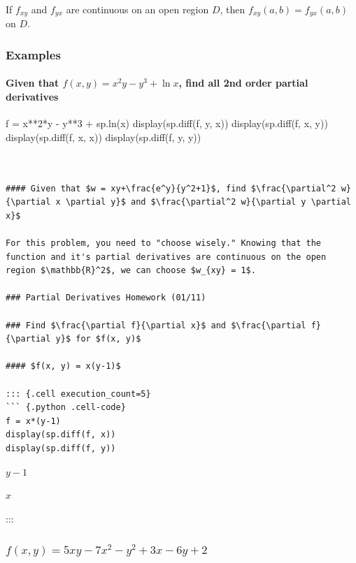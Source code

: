 \documentclass[
  letterpaper,
  DIV=11,
  numbers=noendperiod]{scrartcl}
\let\oldparagraph\paragraph
\renewcommand{\paragraph}[1]{\oldparagraph{#1}\mbox{}}
\begin{document}
If \(f_{xy}\) and \(f_{yx}\) are continuous on an open region \(D\),
then \(f_{xy}(a, b) = f_{yx}(a, b)\) on \(D\).

\hypertarget{examples-6}{%
\subsubsection{Examples}\label{examples-6}}

\hypertarget{given-that-fx-y-x2y-y3ln-x-find-all-2nd-order-partial-derivatives}{%
\paragraph{\texorpdfstring{Given that \(f(x, y) = x^2y-y^3+\ln x\), find
\textbf{all} 2nd order partial
derivatives}{Given that f(x, y) = x\^{}2y-y\^{}3+\textbackslash ln x, find all 2nd order partial derivatives}}\label{given-that-fx-y-x2y-y3ln-x-find-all-2nd-order-partial-derivatives}}

f = x**2*y - y**3 + sp.ln(x) display(sp.diff(f, y, x))
display(sp.diff(f, x, y)) display(sp.diff(f, x, x)) display(sp.diff(f,
y, y))

\begin{verbatim}


#### Given that $w = xy+\frac{e^y}{y^2+1}$, find $\frac{\partial^2 w}{\partial x \partial y}$ and $\frac{\partial^2 w}{\partial y \partial x}$

For this problem, you need to "choose wisely." Knowing that the function and it's partial derivatives are continuous on the open region $\mathbb{R}^2$, we can choose $w_{xy} = 1$.

### Partial Derivatives Homework (01/11)

### Find $\frac{\partial f}{\partial x}$ and $\frac{\partial f}{\partial y}$ for $f(x, y)$

#### $f(x, y) = x(y-1)$

::: {.cell execution_count=5}
``` {.python .cell-code}
f = x*(y-1)
display(sp.diff(f, x))
display(sp.diff(f, y))
\end{verbatim}

$\displaystyle y - 1$

$\displaystyle x$

:::

\hypertarget{fx-y-5xy---7x2---y2-3x---6y-2}{%
\subsubsection{\texorpdfstring{\(f(x, y) = 5xy - 7x^2 - y^2 + 3x - 6y +2\)}{f(x, y) = 5xy - 7x\^{}2 - y\^{}2 + 3x - 6y +2}}\label{fx-y-5xy---7x2---y2-3x---6y-2}}
\end{document}
